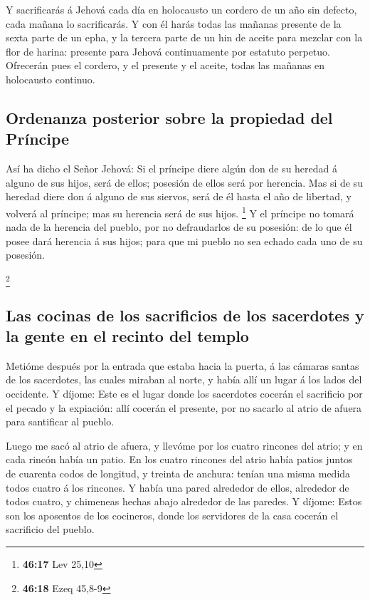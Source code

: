  Y sacrificarás á Jehová cada día en holocausto un cordero
de un año sin defecto, cada mañana lo sacrificarás.  Y con
él harás todas las mañanas presente de la sexta parte de un epha, y la
tercera parte de un hin de aceite para mezclar con la flor de harina:
presente para Jehová continuamente por estatuto perpetuo. 
Ofrecerán pues el cordero, y el presente y el aceite, todas las mañanas
en holocausto continuo.

\hypertarget{ordenanza-posterior-sobre-la-propiedad-del-pruxedncipe}{%
\subsection{Ordenanza posterior sobre la propiedad del
Príncipe}\label{ordenanza-posterior-sobre-la-propiedad-del-pruxedncipe}}

 Así ha dicho el Señor Jehová: Si el príncipe diere algún
don de su heredad á alguno de sus hijos, será de ellos; posesión de
ellos será por herencia.  Mas si de su heredad diere don á
alguno de sus siervos, será de él hasta el año de libertad, y volverá al
príncipe; mas su herencia será de sus hijos. \footnote{\textbf{46:17}
  Lev 25,10}  Y el príncipe no tomará nada de la herencia
del pueblo, por no defraudarlos de su posesión: de lo que él posee dará
herencia á sus hijos; para que mi pueblo no sea echado cada uno de su
posesión.

\footnote{\textbf{46:18} Ezeq 45,8-9}

\hypertarget{las-cocinas-de-los-sacrificios-de-los-sacerdotes-y-la-gente-en-el-recinto-del-templo}{%
\subsection{Las cocinas de los sacrificios de los sacerdotes y la gente
en el recinto del
templo}\label{las-cocinas-de-los-sacrificios-de-los-sacerdotes-y-la-gente-en-el-recinto-del-templo}}

 Metióme después por la entrada que estaba hacia la puerta,
á las cámaras santas de los sacerdotes, las cuales miraban al norte, y
había allí un lugar á los lados del occidente.  Y díjome:
Este es el lugar donde los sacerdotes cocerán el sacrificio por el
pecado y la expiación: allí cocerán el presente, por no sacarlo al atrio
de afuera para santificar al pueblo.

 Luego me sacó al atrio de afuera, y llevóme por los cuatro
rincones del atrio; y en cada rincón había un patio.  En
los cuatro rincones del atrio había patios juntos de cuarenta codos de
longitud, y treinta de anchura: tenían una misma medida todos cuatro á
los rincones.  Y había una pared alrededor de ellos,
alrededor de todos cuatro, y chimeneas hechas abajo alrededor de las
paredes.  Y díjome: Estos son los aposentos de los
cocineros, donde los servidores de la casa cocerán el sacrificio del
pueblo.

